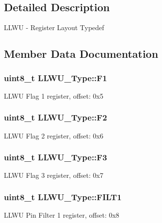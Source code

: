 \subsection{Detailed Description}
L\+L\+WU -\/ Register Layout Typedef 

\subsection{Member Data Documentation}
\subsubsection[{\texorpdfstring{F1}{F1}}]{ uint8\+\_\+t L\+L\+W\+U\+\_\+\+Type\+::\+F1}\hypertarget{structLLWU__Type_a7a06923d73cbfb32196f92cec9832679}{}\label{structLLWU__Type_a7a06923d73cbfb32196f92cec9832679}
L\+L\+WU Flag 1 register, offset\+: 0x5 
\subsubsection[{\texorpdfstring{F2}{F2}}]{ uint8\+\_\+t L\+L\+W\+U\+\_\+\+Type\+::\+F2}\hypertarget{structLLWU__Type_a2e0cf4aaae8993a69589806facbdb943}{}\label{structLLWU__Type_a2e0cf4aaae8993a69589806facbdb943}
L\+L\+WU Flag 2 register, offset\+: 0x6 
\subsubsection[{\texorpdfstring{F3}{F3}}]{ uint8\+\_\+t L\+L\+W\+U\+\_\+\+Type\+::\+F3}\hypertarget{structLLWU__Type_a3c0a1985283644dfd4d68600e899b55f}{}\label{structLLWU__Type_a3c0a1985283644dfd4d68600e899b55f}
L\+L\+WU Flag 3 register, offset\+: 0x7 
\subsubsection[{\texorpdfstring{F\+I\+L\+T1}{FILT1}}]{ uint8\+\_\+t L\+L\+W\+U\+\_\+\+Type\+::\+F\+I\+L\+T1}\hypertarget{structLLWU__Type_aa94a3a9f881724ef6ed7658e387aa159}{}\label{structLLWU__Type_aa94a3a9f881724ef6ed7658e387aa159}
L\+L\+WU Pin Filter 1 register, offset\+: 0x8 
